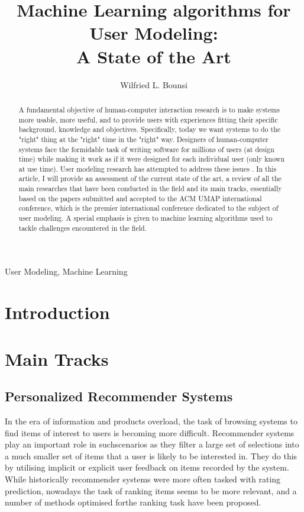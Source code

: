 \documentclass[12pt]{article}
\title{Machine Learning algorithms for User Modeling:\\ A State of the Art}
\author{Wilfried L. Bounsi\inst{1}}
\begin{document}
 

\maketitle
\begin{abstract}
  A fundamental objective of human-computer interaction research is to make systems more usable, more useful, and to provide users with experiences fitting their specific background, knowledge and objectives. Specifically, today we want systems to do the "right" thing at the "right" time in the "right" way. Designers of human-computer systems face the formidable task of writing software for millions of users (at design time) while making it work as if it were designed for each individual user (only known at use time). User modeling research has attempted to address these issues \cite{Fischer2001}. In this article,
  I will provide an assessment of the current state of the art, a review of all the main researches that have been conducted in the field and its main tracks, essentially based on the papers submitted and accepted to the ACM UMAP international conference, which is the premier international conference dedicated to the subject of user modeling. A special emphasis is given to machine learning algorithms used to tackle challenges encountered in the field.
\end{abstract}
\begin{keywords}
User Modeling, Machine Learning
\end{keywords}

\newpage
\tableofcontents
\newpage

\section{Introduction}


\section{Main Tracks}
\subsection{Personalized Recommender Systems}
In the era of information and products overload, the task of browsing systems to find items of interest to users is becoming more difficult. Recommender systems play an important role in suchscenarios as they filter a large set of selections into a much smaller set of items that a user is likely to be interested in. They do this by utilising implicit or explicit user feedback on items recorded by the system. While historically recommender systems were more often tasked with rating prediction, nowadays the task of ranking items seems to be more relevant, and a number of methods optimised forthe ranking task have been proposed.
\end{document}
